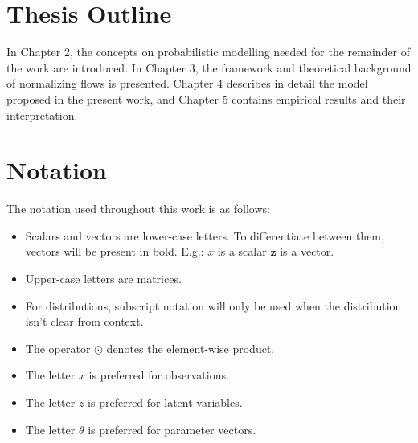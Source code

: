 \section{Thesis Outline}
\label{section:outline}

In Chapter 2, the concepts on probabilistic modelling needed for the remainder
of the work are introduced. In Chapter 3, the framework and theoretical background
of normalizing flows is presented. Chapter 4 describes in detail the model
proposed in the present work, and Chapter 5 contains empirical results and their
interpretation.

\section{Notation}
\label{section:notation}
The notation used throughout this work is as follows:

\begin{itemize}
    \item Scalars and vectors are lower-case letters. To differentiate between
them, vectors will be present in bold. E.g.: $x$ is a scalar $\mathbf{z}$ is
a vector.
    \item Upper-case letters are matrices.
    \item For distributions, subscript notation will only be used when the
distribution isn't clear from context.
    \item The operator $\odot$ denotes the element-wise product.
    \item The letter $x$ is preferred for observations.
    \item The letter $z$ is preferred for latent variables.
    \item The letter $\theta$ is preferred for parameter vectors.
\end{itemize}
